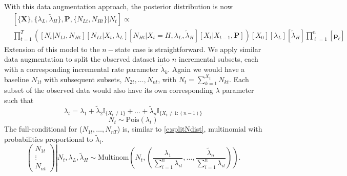 \documentclass[cmbright,fleqn,referee]{envauth}
\begin{document}
With this data augmentation approach, the posterior distribution is now
\begin{equation}
\begin{aligned}
&[\{\mathbf{X}\}, \{\lambda_L, \tilde{\lambda}_H\}, \mathbf{P}, \{N_{Lt}, N_{Ht}\} | N_t  ] \propto \\
&\prod_{t = 1}^T \left( [N_t | N_{Lt}, N_{Ht}] [N_{Lt} | X_t, \lambda_L] [N_{Ht} | X_t = H, \lambda_L, \tilde{\lambda}_H][X_t | X_{t-1}, \mathbf{P}] \right) [X_0][\lambda_L] [\tilde{\lambda}_H] \prod^n_{\ell = 1}[\mathbf{p}_\ell]
\end{aligned}
\end{equation}
Extension of this model to the $n-$state case is straightforward. We apply similar data augmentation to split the observed dataset into $n$ incremental subsets, each with a corresponding incremental rate parameter $\tilde{\lambda}_k$. Again we would have a baseline $N_{1t}$ with subsequent subsets, $N_{2t}, \dots, N_{nt}$, with $N_t = \sum^{X_t}_{k = 1} N_{kt}$. Each subset of the observed data would also have its own corresponding $\lambda$ parameter such that
\begin{equation}
\lambda_t = \lambda_1 + \tilde{\lambda}_{2}\mathbb{I}_{\{X_t \neq 1\}} + \dots + \tilde{\lambda}_n \mathbb{I}_{\{X_t \neq 1:(n-1) \}}
\end{equation}
\begin{equation}
N_t \sim \text{Pois}(\lambda_{t})
\end{equation}
The full-conditional for ($N_{1t}, \dots, N_{nT}$) is, similar to \eqref{e:splitNdist}, multinomial with probabilities proportional to $\tilde{\lambda}_i$.
\begin{equation}
\left. \begin{pmatrix}
    	N_{1t}\\
        \vdots\\
        N_{nt}
    	\end{pmatrix} \right| N_t, \lambda_L, \tilde{\lambda}_H  \sim 
\text{Multinom}\left(N_t,  \left(\frac{\lambda_1}{\sum_{i=1}^{n}\lambda_{it}},
\dots,
\frac{\tilde{\lambda}_n}{\sum_{i=1}^{n}\lambda_{it}}\right)\right).
\end{equation}
\end{document}
